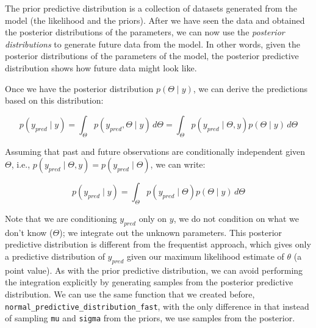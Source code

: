 \documentclass[12pt,]{krantz}
\newenvironment{Shaded}{\begin{snugshade}}{\end{snugshade}}
\newcommand{\DataTypeTok}[1]{\textcolor[rgb]{0.13,0.29,0.53}{#1}}
\newcommand{\KeywordTok}[1]{\textcolor[rgb]{0.13,0.29,0.53}{\textbf{#1}}}
\newcommand{\NormalTok}[1]{#1}
\newcommand{\OperatorTok}[1]{\textcolor[rgb]{0.81,0.36,0.00}{\textbf{#1}}}
\newcommand{\StringTok}[1]{\textcolor[rgb]{0.31,0.60,0.02}{#1}}
\theoremstyle{definition}
\theoremstyle{definition}
\theoremstyle{definition}
\theoremstyle{remark}
\begin{document}
The prior predictive distribution is a collection of datasets generated from the model (the likelihood and the priors). After we have seen the data and obtained the posterior distributions of the parameters, we can now use the \emph{posterior distributions} to generate future data from the model. In other words, given the posterior distributions of the parameters of the model, the posterior predictive distribution shows how future data might look like.

Once we have the posterior distribution \(p(\Theta\mid y)\), we can derive the predictions based on this distribution:

\begin{equation}
p(y_{pred}\mid y ) = \int_\Theta p(y_{pred}, \Theta\mid y)\, d\Theta= \int_\Theta 
p(y_{pred}\mid \Theta,y)p(\Theta\mid y)\, d\Theta
\end{equation}

Assuming that past and future observations are conditionally independent given \(\Theta\), i.e., \(p(y_{pred}\mid \Theta,y)= p(y_{pred}\mid \Theta)\), we can write:

\begin{equation}
p(y_{pred}\mid y )=\int_\Theta p(y_{pred}\mid \Theta) p(\Theta\mid y)\, d\Theta
\label{eq:postpp}
\end{equation}

Note that we are conditioning \(y_{pred}\) only on \(y\), we do not condition on what we don't know (\(\Theta\)); we integrate out the unknown parameters. This posterior predictive distribution is different from the frequentist approach, which gives only a predictive distribution of \(y_{pred}\) given our maximum likelihood estimate of \(\theta\) (a point value). As with the prior predictive distribution, we can avoid performing the integration explicitly by generating samples from the posterior predictive distribution. We can use the same function that we created before, \texttt{normal\_predictive\_distribution\_fast}, with the only difference in that instead of sampling \texttt{mu} and \texttt{sigma} from the priors, we use samples from the posterior.

\begin{Shaded}
\end{Shaded}
\end{document}
